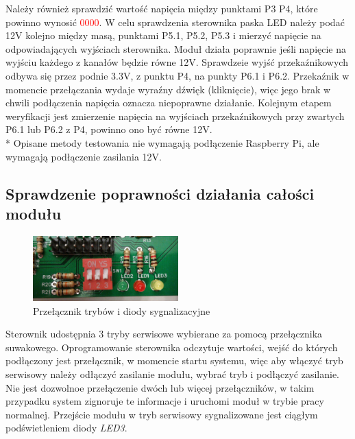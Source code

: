 \documentclass[12pt, eng, twoside, openany, final]{mgr}
\begin{document}
            Należy również sprawdzić wartość napięcia między punktami P3 P4, które powinno wynosić  \textcolor{red}{0000}.
            W celu sprawdzenia sterownika paska LED należy podać 12V kolejno między masą, punktami P5.1, P5.2, P5.3 i mierzyć napięcie na odpowiadających wyjściach sterownika. Moduł działa poprawnie jeśli napięcie na wyjściu każdego z kanałów będzie równe 12V.
            Sprawdzeie wyjść przekaźnikowych odbywa się przez podnie 3.3V, z punktu P4, na punkty P6.1 i P6.2.
            Przekaźnik w momencie przełączania wydaje wyraźny dźwięk (kliknięcie), więc jego brak w chwili podłączenia napięcia oznacza niepoprawne działanie. Kolejnym etapem weryfikacji jest zmierzenie napięcia na wyjściach przekaźnikowych przy zwartych P6.1 lub P6.2 z P4, powinno ono być równe 12V.
            \\* Opisane metody testowania nie wymagają podłączenie Raspberry Pi, ale wymagają podłączenie zasilania 12V. 
            
            \subsection{Sprawdzenie poprawności działania całości modułu}
                \begin{figure}[H]
                \begin{center}
                    \includegraphics[width=0.5\textwidth]{dip_zoom.jpg}
                    \caption{Przełącznik trybów i diody sygnalizacyjne}
                \end{center}
                \end{figure}
            Sterownik udostępnia 3 tryby serwisowe wybierane za pomocą przełącznika suwakowego.
            Oprogramowanie sterownika odczytuje wartości, wejść do których podłączony jest przełącznik, w momencie startu systemu, więc aby włączyć tryb serwisowy należy odłączyć zasilanie modułu, wybrać tryb i podłączyć zasilanie. Nie jest dozwolnoe przełączenie dwóch lub więcej przełączników, w takim przypadku system zignoruje te informacje i uruchomi moduł w trybie pracy normalnej. Przejście modułu w tryb serwisowy sygnalizowane jest ciągłym podświetleniem diody \emph{LED3}.
            
\end{document}
